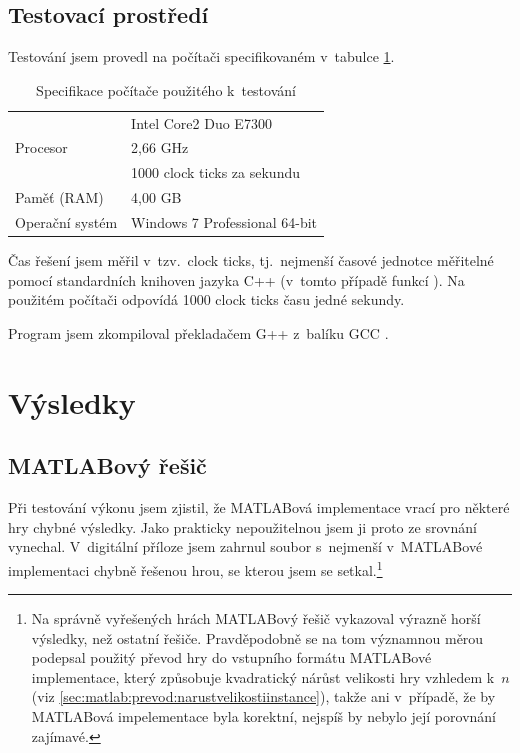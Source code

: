 \subsection{Testovací prostředí}
Testování jsem provedl na počítači specifikovaném v~tabulce \ref{tab:specifikacepocitace}.
\begin{table}[htbp]
\label{tab:specifikacepocitace}
\caption{Specifikace počítače použitého k~testování}
\begin{center}
\begin{tabular}{|l|l|}
\hline
\multirow{3}{*}{Procesor} & Intel Core2 Duo E7300 \\
 & 2,66 GHz \\
 & 1000 clock ticks za sekundu \\
\hline
Paměť (RAM) & 4,00 GB \\
\hline
Operační systém & Windows 7 Professional 64-bit \\
\hline
\end{tabular}
\end{center}
\end{table}

Čas řešení jsem měřil v~tzv.~clock ticks, tj.~nejmenší časové jednotce měřitelné pomocí standardních knihoven jazyka C++ (v~tomto případě funkcí ). Na použitém počítači odpovídá 1000 clock ticks času jedné sekundy.

Program jsem zkompiloval překladačem G++ z~balíku GCC \cite{GCC}.
\section{Výsledky}
\subsection{MATLABový řešič}
Při testování výkonu jsem zjistil, že MATLABová implementace vrací pro některé hry chybné výsledky. Jako prakticky nepoužitelnou jsem ji proto ze srovnání vynechal. V~digitální příloze jsem zahrnul soubor  s~nejmenší v~MATLABové implementaci chybně řešenou hrou, se kterou jsem se setkal.\footnote{Na správně vyřešených hrách MATLABový řešič vykazoval výrazně horší výsledky, než ostatní řešiče. Pravděpodobně se na tom významnou měrou podepsal použitý převod hry do vstupního formátu MATLABové implementace, který způsobuje kvadratický nárůst velikosti hry vzhledem k~$n$ (viz \ref{sec:matlab:prevod:narustvelikostiinstance}), takže ani v~případě, že by MATLABová impelementace byla korektní, nejspíš by nebylo její porovnání zajímavé.}
